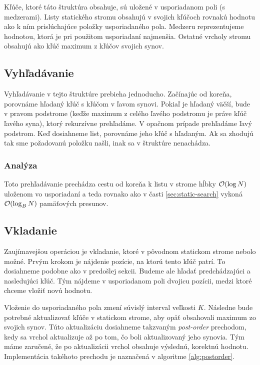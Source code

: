 Kľúče, ktoré táto štruktúra obsahuje, sú uložené v usporiadanom poli (s medzerami). Listy statického stromu obsahujú v svojich kľúčoch rovnakú hodnotu ako k ním prislúchajúce položky usporiadaného pola. Medzeru reprezentujeme hodnotou, ktorá je pri použitom usporiadaní najmenšia. Ostatné vrcholy stromu obsahujú ako kľúč maximum z kľúčov svojich synov.

\subsection{Vyhľadávanie} \label{sec:dynamic-obliv-search}
Vyhľadávanie v tejto štruktúre prebieha jednoducho. Začínajúc od koreňa, porovnáme hľadaný kľúč s kľúčom v ľavom synovi. Pokiaľ je hľadaný väčší, bude v pravom podstrome (keďže maximum z celého ľavého podstromu je práve kľúč ľavého syna), ktorý rekurzívne prehľadáme. V opačnom prípade prehľadáme ľavý podstrom. Keď dosiahneme list, porovnáme jeho kľúč s hľadaným. Ak sa zhodujú tak sme požadovanú položku našli, inak sa v štruktúre nenachádza.

\subsubsection{Analýza}

Toto prehľadávanie prechádza cestu od koreňa k listu v strome hĺbky $\mathcal{O}(\log{N})$ uloženom vo \vEB usporiadaní a teda rovnako ako v časti \ref{sec:static-search} vykoná $\mathcal{O}(\log_B{N})$ pamäťových presunov.

\subsection{Vkladanie}
Zaujímavejšou operáciou je vkladanie, ktoré v pôvodnom statickom strome nebolo možné. Prvým krokom je nájdenie pozície, na ktorú tento kľúč patrí. To dosiahneme podobne ako v predošlej sekcii. Budeme ale hľadať predchádzajúci a nasledujúci kľúč. Tým nájdeme v usporiadanom poli dvojicu pozícii, medzi ktoré chceme vložiť novú hodnotu.

Vloženie do usporiadaného pola zmení súvislý interval veľkosti $K$. Následne bude potrebné aktualizovať kľúče v statickom strome, aby opäť obsahovali maximum zo svojich synov. Túto aktualizáciu dosiahneme takzvaným \emph{post-order} prechodom, kedy sa vrchol aktualizuje až po tom, čo boli aktualizovaný jeho synovia. Tým máme zaručené, že po aktualizácii vrchol obsahuje výslednú, korektnú hodnotu. Implementácia takéhoto prechodu je naznačená v algoritme \ref{alg:postorder}.

